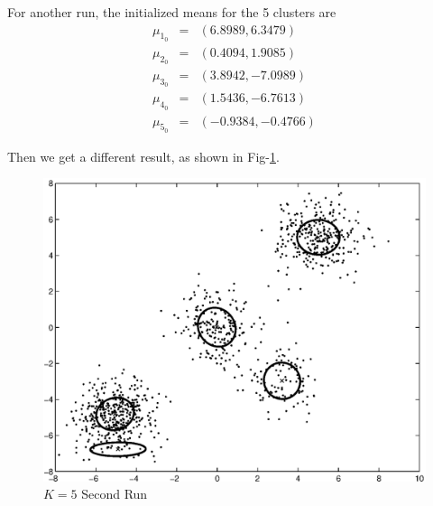 \documentclass[12pt]{article}
\begin{document}
For another run, the initialized means for the 5 clusters are
\begin{eqnarray*}
\mu_{1_0} &=& (6.8989,    6.3479) \\
\mu_{2_0} &=& (0.4094,    1.9085) \\
\mu_{3_0} &=& (3.8942,   -7.0989) \\
\mu_{4_0} &=& (1.5436,   -6.7613) \\
\mu_{5_0} &=& (-0.9384,   -0.4766)
\end{eqnarray*}

Then we get a different result, as shown in Fig-\ref{fig:c2-2}. \\

\begin{figure}[ht!]
  \centering
  \includegraphics[width=0.7 \textwidth]{c2-2}
  \caption{$K = 5$ Second Run \label{fig:c2-2}}
\end{figure}
\end{document}
